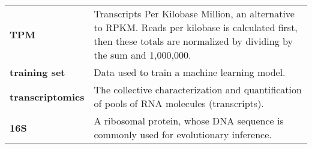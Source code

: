 \begin{singlespace}
\begin{longtable}{ p{}  p{} }
\textbf{TPM} & %
	Transcripts Per Kilobase Million, an alternative to RPKM.
	Reads per kilobase is calculated first, then these totals are normalized by dividing by the sum and 1,000,000. \\
\textbf{training set} &  Data used to train a machine learning model. \\
\textbf{transcriptomics} & The collective characterization and quantification of pools of RNA molecules (transcripts). \\
\textbf{16S} & A ribosomal protein, whose DNA sequence is commonly used for evolutionary inference. \\

\end{longtable}
\end{singlespace}
